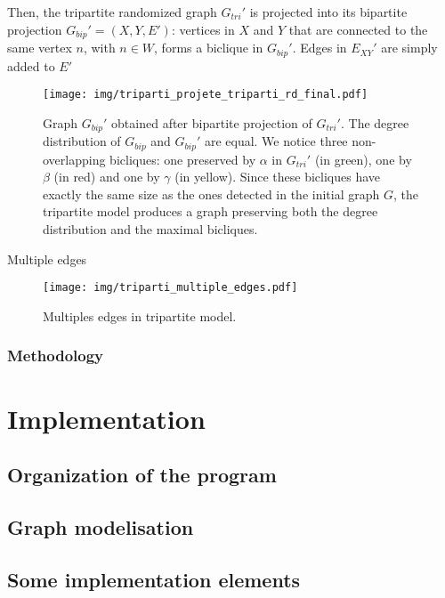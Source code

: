 \documentclass[table]{report}
\begin{document}
Then, the tripartite randomized graph ${G_{tri}}'$ is projected into its bipartite projection ${G_{bip}}'=(X,Y,E')$: vertices in $X$ and $Y$ that are connected to the same vertex $n$, with $n \in W$, forms a biclique in ${G_{bip}}'$. Edges in ${E_{XY}}'$ are simply added to $E'$

\begin{figure}[h]%
\centering
\texttt{[image: img/triparti\_projete\_triparti\_rd\_final.pdf]}
\caption{Graph ${G_{bip}}'$ obtained after bipartite projection of ${G_{tri}}'$. The degree distribution of ${G_{bip}}$ and ${G_{bip}}'$ are equal. We notice three non-overlapping bicliques: one preserved by $\alpha$ in ${G_{tri}}'$ (in green), one by $\beta$ (in red) and one by $\gamma$ (in yellow). Since these bicliques have exactly the same size as the ones detected in the initial graph $G$, the tripartite model produces a graph preserving both the degree distribution and the maximal bicliques.}
\label{fig:graphs}
\end{figure}
\FloatBarrier

Multiple edges 

\begin{figure}[h]%
\centering
\texttt{[image: img/triparti\_multiple\_edges.pdf]}
\caption{Multiples edges in tripartite model. }
\label{fig:graphs}
\end{figure}
\FloatBarrier







\subsection{Methodology}

\chapter{Implementation}
\minitoc
\section{Organization of the program}
\section{Graph modelisation}
\section{Some implementation elements}
\end{document}

